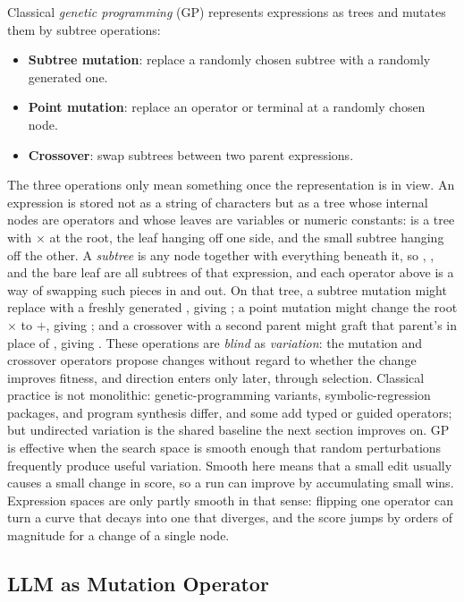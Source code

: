 Classical \emph{genetic programming} (GP) represents expressions as trees and mutates them by subtree operations:
\begin{itemize}
\item \textbf{Subtree mutation}: replace a randomly chosen subtree with a randomly generated one.
\item \textbf{Point mutation}: replace an operator or terminal at a randomly chosen node.
\item \textbf{Crossover}: swap subtrees between two parent expressions.
\end{itemize}
The three operations only mean something once the representation is in view.
An expression is stored not as a string of characters but as a tree whose internal nodes are operators and whose leaves are variables or numeric constants:  is a tree with $\times$ at the root, the leaf  hanging off one side, and the small subtree  hanging off the other.
A \emph{subtree} is any node together with everything beneath it, so , , and the bare leaf  are all subtrees of that expression, and each operator above is a way of swapping such pieces in and out.
On that tree, a subtree mutation might replace  with a freshly generated , giving ; a point mutation might change the root $\times$ to $+$, giving ; and a crossover with a second parent  might graft that parent's  in place of , giving .
These operations are \emph{blind} as \emph{variation}: the mutation and crossover operators propose changes without regard to whether the change improves fitness, and direction enters only later, through selection.
Classical practice is not monolithic: genetic-programming variants, symbolic-regression packages, and program synthesis differ, and some add typed or guided operators; but undirected variation is the shared baseline the next section improves on.
GP is effective when the search space is smooth enough that random perturbations frequently produce useful variation.
Smooth here means that a small edit usually causes a small change in score, so a run can improve by accumulating small wins.
Expression spaces are only partly smooth in that sense: flipping one operator can turn a curve that decays into one that diverges, and the score jumps by orders of magnitude for a change of a single node.

\subsection{LLM as Mutation Operator}


